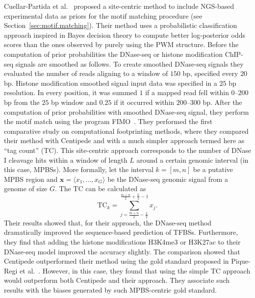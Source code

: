 Cuellar-Partida et al.~\cite{cuellar2012} proposed a site-centric method to include NGS-based experimental data as priors for the motif matching procedure (see Section~\ref{sec:motif.matching}). Their method uses a probabilistic classification approach inspired in Bayes decision theory to compute better log-posterior odds scores than the ones observed by purely using the PWM structure. Before the computation of prior probabilities the DNase-seq or histone modification ChIP-seq signals are smoothed as follows. To create smoothed DNase-seq signals they evaluated the number of reads aligning to a window of $150$ bp, specified every $20$ bp. Histone modification smoothed signal input data was specified in a $25$ bp resolution. In every position, it was summed $ 1 $ if a mapped read fell within $0$--$200$ bp from the $25$ bp window and $ 0.25 $ if it occurred within $200$--$300$ bp. After the computation of prior probabilities with smoothed DNase-seq signal, they perform the motif match using the program FIMO~\cite{grant2011}. They performed the first comparative study on computational footprinting methods, where they compared their method with Centipede and with a much simpler approach termed here as ``tag count'' (TC). This site-centric approach corresponds to the number of DNase I cleavage hits within a window of length $L$ around a certain genomic interval (in this case, MPBSs). More formally, let the interval ${k} = [{m},{n}]$ be a putative MPBS region and $\mathbf{x} = \langle x_1, ..., x_G\rangle$ be the DNase-seq genomic signal from a genome of size $G$. The TC can be calculated as 
\begin{equation}
  \label{eq:tc}
  \text{TC}_{k} = \sum_{j={\frac{m+n}{2}-\frac{L}{2}}}^{\frac{m+n}{2}+\frac{L}{2}-1} {x}_{j}.
\end{equation}
Their results showed that, for their approach, the DNase-seq method dramatically improved the sequence-based prediction of TFBSs. Furthermore, they find that adding the histone modifications H3K4me3 or H3K27ac to their DNase-seq model improved the accuracy slightly. The comparison showed that Centipede outperformed their method using the gold standard proposed in Pique-Regi et al.~\cite{pique2011}. However, in this case, they found that using the simple TC approach would outperform both Centipede and their approach. They associate such results with the biases generated by such MPBS-centric gold standard.

